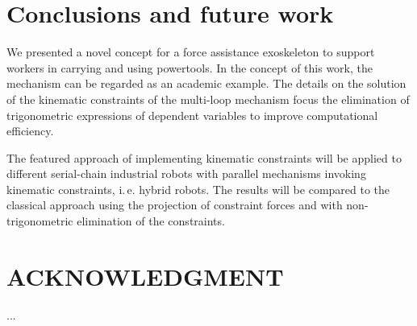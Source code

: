 \documentclass[letterpaper, 10 pt, conference]{ieeeconf}  %
\begin{document}
\section{Conclusions and future work}

We presented a novel concept for a force assistance exoskeleton to support workers in carrying and using powertools.
In the concept of this work, the mechanism can be regarded as an academic example.
The details on the solution of the kinematic constraints of the multi-loop mechanism focus the elimination of trigonometric expressions of dependent variables to improve computational efficiency.

The featured approach of implementing kinematic constraints will be applied to different serial-chain industrial robots with parallel mechanisms invoking kinematic constraints, i.\,e. hybrid robots. 
The results will be compared to the classical approach using the projection of constraint forces and with non-trigonometric elimination of the constraints.

\addtolength{\textheight}{-12cm}   %







%


\section*{ACKNOWLEDGMENT}

...






\end{document}
